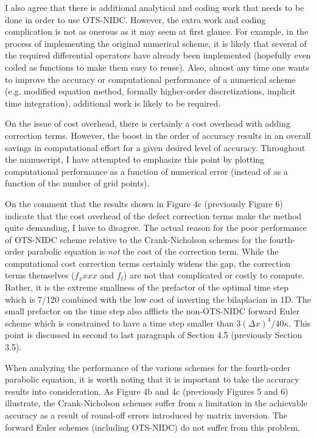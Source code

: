 \documentclass[12pt]{article}
\begin{document}
I also agree that there is additional analytical and coding work
that needs to be done in order to use OTS-NIDC.  However, the extra work and
coding complication is not as onerous as it may seem at first glance.  For
example, in the process of implementing the original numerical scheme, it is
likely that several of the required differential operators have already been 
implemented (hopefully even coded as functions to make them easy to reuse).  
Also, almost any time one wants to improve the accuracy or computational
performance of a numerical scheme (e.g.  modified equation method, formally
higher-order discretizations, implicit time integration), additional work is
likely to be required.

On the issue of cost overhead, there is certainly a cost overhead with adding 
correction terms.  However, the boost in the order of accuracy results in an
overall savings in computational effort for a given desired level of accuracy.
Throughout the manuscript, I have attempted to emphasize this point by plotting
computational performance as a function of numerical error (instead of as a
function of the number of grid points).

On the comment that the results shown in Figure 4c (previously Figure 6)
indicate that the cost overhead of the defect correction terms make the method 
quite demanding, I have to disagree.  The actual reason for the poor
performance of OTS-NIDC scheme relative to the Crank-Nicholson schemes for the
fourth-order parabolic equation is \emph{not} the cost of the correction term. 
While the computational cost correction terms certainly widens the gap, 
the correction terms themselves ($f_xxxx$ and $f_t$) are not that complicated or
costly to compute.  Rather, it is the extreme smallness of the prefactor of
the optimal time step which is 7/120 combined with the low cost of inverting
the bilaplacian in 1D.  The small prefactor on the time step also afflicts the
non-OTS-NIDC forward Euler scheme which is constrained to have a time step 
smaller than $3 (\Delta x)^4 / 40 \kappa$.  This point is discussed in second
to last paragraph of Section 4.5 (previously Section 3.5).

When analyzing the performance of the various schemes for the fourth-order
parabolic equation, it is worth noting that it is important to take the
accuracy results into consideration.  As Figure 4b and 4c (previously Figures
5 and 6) illustrate, the Crank-Nicholson schemes suffer from a limitation in
the achievable accuracy as a result of round-off errors introduced by matrix
inversion.  The forward Euler schemes (including OTS-NIDC) do not suffer from
this problem.
\end{document}
